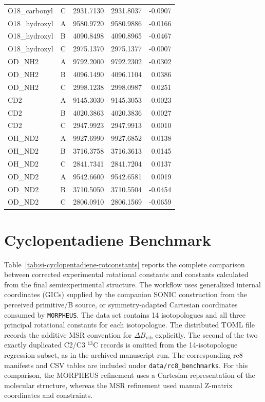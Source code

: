 \documentclass[12pt]{article}
\begin{document}
\begin{longtable}{llrrr}
O18\_carbonyl & C & 2931.7130 & 2931.8037 & -0.0907 \\
O18\_hydroxyl & A & 9580.9720 & 9580.9886 & -0.0166 \\
O18\_hydroxyl & B & 4090.8498 & 4090.8965 & -0.0467 \\
O18\_hydroxyl & C & 2975.1370 & 2975.1377 & -0.0007 \\
OD\_NH2 & A & 9792.2000 & 9792.2302 & -0.0302 \\
OD\_NH2 & B & 4096.1490 & 4096.1104 & 0.0386 \\
OD\_NH2 & C & 2998.1238 & 2998.0987 & 0.0251 \\
CD2 & A & 9145.3030 & 9145.3053 & -0.0023 \\
CD2 & B & 4020.3863 & 4020.3836 & 0.0027 \\
CD2 & C & 2947.9923 & 2947.9913 & 0.0010 \\
OH\_ND2 & A & 9927.6990 & 9927.6852 & 0.0138 \\
OH\_ND2 & B & 3716.3758 & 3716.3613 & 0.0145 \\
OH\_ND2 & C & 2841.7341 & 2841.7204 & 0.0137 \\
OD\_ND2 & A & 9542.6600 & 9542.6581 & 0.0019 \\
OD\_ND2 & B & 3710.5050 & 3710.5504 & -0.0454 \\
OD\_ND2 & C & 2806.0910 & 2806.1569 & -0.0659 \\
\bottomrule
\end{longtable}

\section{Cyclopentadiene Benchmark}

Table~\ref{tab:si-cyclopentadiene-rotconstants} reports the complete
comparison between corrected experimental rotational constants and constants
calculated from the final semiexperimental structure. The workflow uses
generalized internal coordinates (GICs) supplied by the companion SONIC
construction from the perceived primitive/B source, or symmetry-adapted Cartesian coordinates consumed by
\texttt{MORPHEUS}. The data set contains 14
isotopologues and all three principal rotational constants for each
isotopologue. The distributed TOML file records the additive MSR convention
for $\Delta B_\mathrm{vib}$ explicitly. The second of the two exactly duplicated
C2/C3 $^{13}$C records is omitted from the 14-isotopologue regression subset,
as in the archived manuscript run. The corresponding rc8 manifests and CSV
tables are included under \texttt{data/rc8\_benchmarks}. For this comparison, the
MORPHEUS refinement uses a Cartesian representation of the molecular structure,
whereas the MSR refinement used manual Z-matrix
coordinates and constraints.
\end{document}
